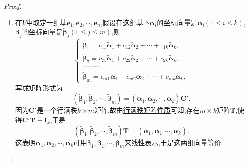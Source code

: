 \documentclass[../../main.tex]{subfiles}%
\begin{document}
\begin{proof}
\begin{enumerate}[(1)]
\item 在\(V\)中取定一组基\(\boldsymbol{e}_1,\boldsymbol{e}_2,\cdots,\boldsymbol{e}_n\),假设在这组基下\(\boldsymbol{\alpha}_i\)的坐标向量是\(\widetilde{\boldsymbol{\alpha}}_i(1\leqslant  i\leqslant  k)\),\(\boldsymbol{\beta}_j\)的坐标向量是\(\widetilde{\boldsymbol{\beta}}_j(1\leqslant  j\leqslant  m)\),则
\[
\begin{cases}
\widetilde{\boldsymbol{\beta}}_1 = c_{11}\widetilde{\boldsymbol{\alpha}}_1 + c_{12}\widetilde{\boldsymbol{\alpha}}_2+\cdots + c_{1k}\widetilde{\boldsymbol{\alpha}}_k,\\
\widetilde{\boldsymbol{\beta}}_2 = c_{21}\widetilde{\boldsymbol{\alpha}}_1 + c_{22}\widetilde{\boldsymbol{\alpha}}_2+\cdots + c_{2k}\widetilde{\boldsymbol{\alpha}}_k,\\
\cdots\cdots\cdots\cdots\\
\widetilde{\boldsymbol{\beta}}_m = c_{m1}\widetilde{\boldsymbol{\alpha}}_1 + c_{m2}\widetilde{\boldsymbol{\alpha}}_2+\cdots + c_{mk}\widetilde{\boldsymbol{\alpha}}_k,
\end{cases}
\]
写成矩阵形式为
\[
(\widetilde{\boldsymbol{\beta}}_1,\widetilde{\boldsymbol{\beta}}_2,\cdots,\widetilde{\boldsymbol{\beta}}_m)=(\widetilde{\boldsymbol{\alpha}}_1,\widetilde{\boldsymbol{\alpha}}_2,\cdots,\widetilde{\boldsymbol{\alpha}}_k)\boldsymbol{C}'.
\]
因为\(\boldsymbol{C}'\)是一个行满秩\(k\times m\)矩阵,故由\hyperref[proposition:行/列满秩矩阵性质]{行满秩矩阵性质}可知,存在\(m\times k\)矩阵\(\boldsymbol{T}\),使得\(\boldsymbol{C}'\boldsymbol{T}=\boldsymbol{I}_k\),于是
\[
(\widetilde{\boldsymbol{\beta}}_1,\widetilde{\boldsymbol{\beta}}_2,\cdots,\widetilde{\boldsymbol{\beta}}_m)\boldsymbol{T}=(\widetilde{\boldsymbol{\alpha}}_1,\widetilde{\boldsymbol{\alpha}}_2,\cdots,\widetilde{\boldsymbol{\alpha}}_k).
\]
这表明\(\boldsymbol{\alpha}_1,\boldsymbol{\alpha}_2,\cdots,\boldsymbol{\alpha}_k\)可用\(\boldsymbol{\beta}_1,\boldsymbol{\beta}_2,\cdots,\boldsymbol{\beta}_m\)来线性表示,于是这两组向量等价.


\end{enumerate}
\end{proof}
\end{document}
